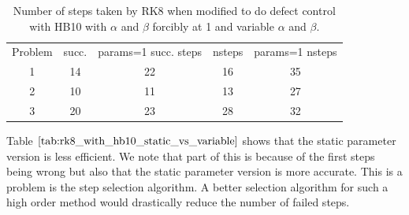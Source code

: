 \begin{table}[h]
\caption {Number of steps taken by RK8 when modified to do defect control with HB10 with $\alpha$ and $\beta$ forcibly at 1 and variable $\alpha$ and $\beta$.} \label{tab:rk8_with_hb10_static_vs_variable}
\begin{center}
\begin{tabular}{ c c c c c } 
Problem & succ. & params=1 succ. steps & nsteps & params=1 nsteps \\ 
1       & 14  &        22          & 16   & 35\\ 
2       & 10  &        11          & 13   & 27\\
3       & 20  &        23          & 28   & 32\\
\end{tabular}
\end{center}
\end{table}	

Table $\ref{tab:rk8_with_hb10_static_vs_variable}$ shows that the static parameter version is less efficient. We note that part of this is because of the first steps being wrong but also that the static parameter version is more accurate. This is a problem is the step selection algorithm. A better selection algorithm for such a high order method would drastically reduce the number of failed  steps.